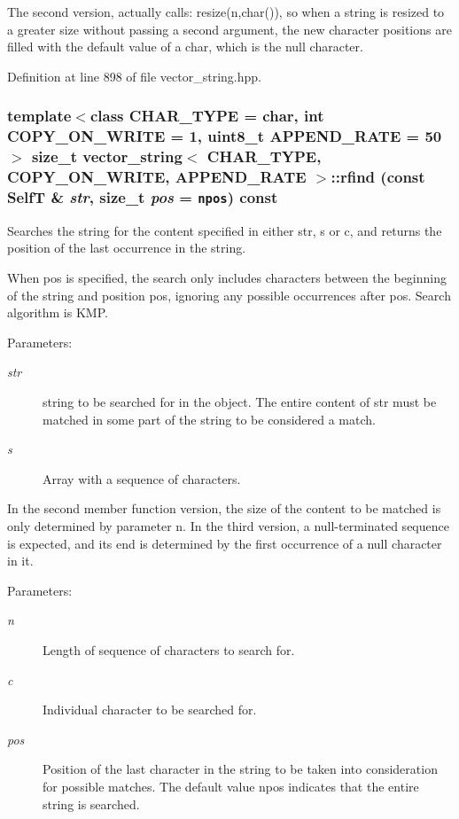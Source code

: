 The second version, actually calls: resize(n,char()), so when a string is resized to a greater size without passing a second argument, the new character positions are filled with the default value of a char, which is the null character. 

Definition at line 898 of file vector\_\-string.hpp.\hypertarget{classvector__string_75a476214f4b7888df557f566aa51b0a}{
\subsubsection[{rfind}]{\setlength{\rightskip}{0pt plus 5cm}template$<$class CHAR\_\-TYPE  = char, int COPY\_\-ON\_\-WRITE = 1, uint8\_\-t APPEND\_\-RATE = 50$>$ size\_\-t {\bf vector\_\-string}$<$ CHAR\_\-TYPE, COPY\_\-ON\_\-WRITE, APPEND\_\-RATE $>$::rfind (const {\bf SelfT} \& {\em str}, \/  size\_\-t {\em pos} = {\tt {\bf npos}}) const}}
\label{classvector__string_75a476214f4b7888df557f566aa51b0a}


Searches the string for the content specified in either str, s or c, and returns the position of the last occurrence in the string.

When pos is specified, the search only includes characters between the beginning of the string and position pos, ignoring any possible occurrences after pos. Search algorithm is KMP.

\begin{Desc}
\item[Parameters:]
\begin{description}
\item[{\em str}]string to be searched for in the object. The entire content of str must be matched in some part of the string to be considered a match. \item[{\em s}]Array with a sequence of characters.\end{description}
\end{Desc}
In the second member function version, the size of the content to be matched is only determined by parameter n. In the third version, a null-terminated sequence is expected, and its end is determined by the first occurrence of a null character in it. \begin{Desc}
\item[Parameters:]
\begin{description}
\item[{\em n}]Length of sequence of characters to search for. \item[{\em c}]Individual character to be searched for. \item[{\em pos}]Position of the last character in the string to be taken into consideration for possible matches. The default value npos indicates that the entire string is searched. \end{description}
\end{Desc}


